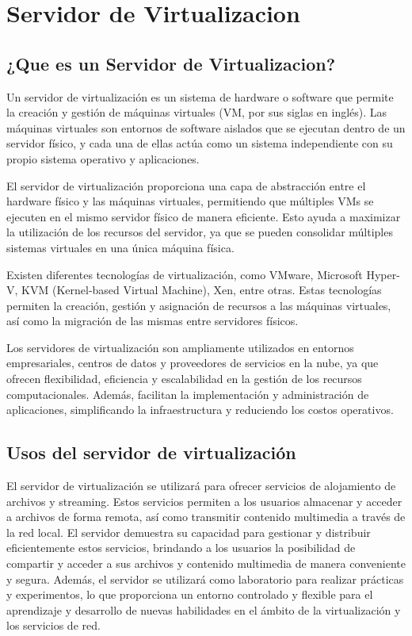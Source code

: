 \chapter{Servidor de Virtualizacion}\label{ch:servidor}

	\section{¿Que es un Servidor de Virtualizacion?}
	
		
		Un servidor de virtualización es un sistema de hardware o software que permite la creación y gestión de máquinas virtuales (VM, por sus siglas en inglés). Las máquinas virtuales son entornos de software aislados que se ejecutan dentro de un servidor físico, y cada una de ellas actúa como un sistema independiente con su propio sistema operativo y aplicaciones.
		
		El servidor de virtualización proporciona una capa de abstracción entre el hardware físico y las máquinas virtuales, permitiendo que múltiples VMs se ejecuten en el mismo servidor físico de manera eficiente. Esto ayuda a maximizar la utilización de los recursos del servidor, ya que se pueden consolidar múltiples sistemas virtuales en una única máquina física.
		
		Existen diferentes tecnologías de virtualización, como VMware, Microsoft Hyper-V, KVM (Kernel-based Virtual Machine), Xen, entre otras. Estas tecnologías permiten la creación, gestión y asignación de recursos a las máquinas virtuales, así como la migración de las mismas entre servidores físicos.
		
		Los servidores de virtualización son ampliamente utilizados en entornos empresariales, centros de datos y proveedores de servicios en la nube, ya que ofrecen flexibilidad, eficiencia y escalabilidad en la gestión de los recursos computacionales. Además, facilitan la implementación y administración de aplicaciones, simplificando la infraestructura y reduciendo los costos operativos.	
			
				
			\section{Usos del servidor de virtualización}
			
		El servidor de virtualización se utilizará para ofrecer servicios de alojamiento de archivos y streaming. Estos servicios permiten a los usuarios almacenar y acceder a archivos de forma remota, así como transmitir contenido multimedia a través de la red local. El servidor demuestra su capacidad para gestionar y distribuir eficientemente estos servicios, brindando a los usuarios la posibilidad de compartir y acceder a sus archivos y contenido multimedia de manera conveniente y segura. Además, el servidor se utilizará como laboratorio para realizar prácticas y experimentos, lo que proporciona un entorno controlado y flexible para el aprendizaje y desarrollo de nuevas habilidades en el ámbito de la virtualización y los servicios de red.
				
